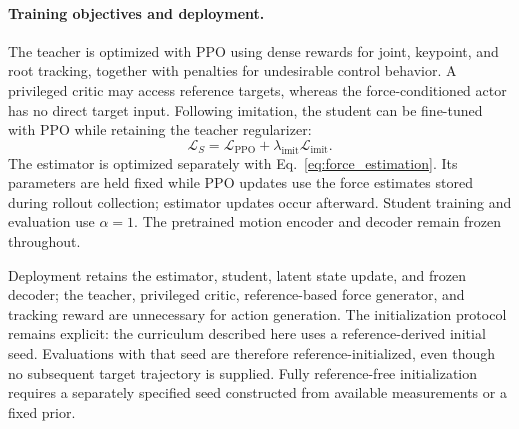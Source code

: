 \paragraph{Training objectives and deployment.}
The teacher is optimized with PPO using dense rewards for joint, keypoint, and root tracking, together with penalties for undesirable control behavior. A privileged critic may access reference targets, whereas the force-conditioned actor has no direct target input. Following imitation, the student can be fine-tuned with PPO while retaining the teacher regularizer:
\begin{equation}
    \mathcal L_S=\mathcal L_{\mathrm{PPO}}
                 +\lambda_{\mathrm{imit}}\mathcal L_{\mathrm{imit}}.
    \label{eq:student_training}
\end{equation}
The estimator is optimized separately with Eq.~\eqref{eq:force_estimation}. Its parameters are held fixed while PPO updates use the force estimates stored during rollout collection; estimator updates occur afterward. Student training and evaluation use $\alpha=1$. The pretrained motion encoder and decoder remain frozen throughout.

Deployment retains the estimator, student, latent state update, and frozen decoder; the teacher, privileged critic, reference-based force generator, and tracking reward are unnecessary for action generation. The initialization protocol remains explicit: the curriculum described here uses a reference-derived initial seed. Evaluations with that seed are therefore reference-initialized, even though no subsequent target trajectory is supplied. Fully reference-free initialization requires a separately specified seed constructed from available measurements or a fixed prior.

